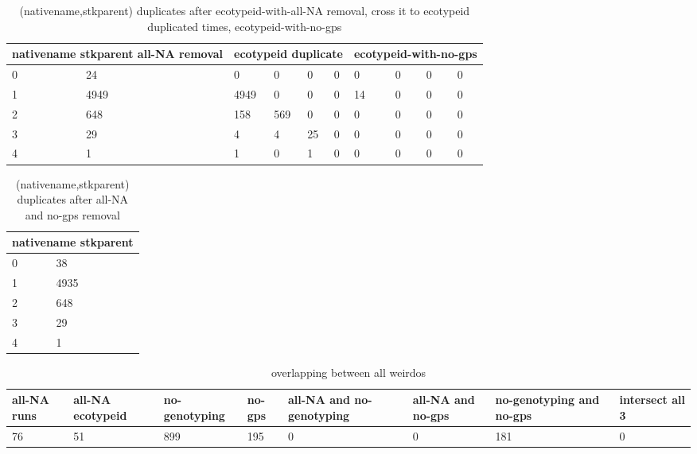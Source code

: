 \begin{center}
\begin{longtable}{|l|l|l|l|l|l|l|l|l|l|}
\caption{ (nativename,stkparent) duplicates after ecotypeid-with-all-NA removal, cross it to ecotypeid duplicated times, ecotypeid-with-no-gps} \label{t_nn_sp_e_4}\\
\hline
\multicolumn{2}{|c|}{nativename stkparent all-NA removal}&\multicolumn{4}{|c|}{ecotypeid duplicate}&\multicolumn{4}{|c|}{ecotypeid-with-no-gps}\\
\hline
0&24&0&0&0&0&0&0&0&0\\
1&4949&4949&0&0&0&14&0&0&0\\
2&648&158&569&0&0&0&0&0&0\\
3&29&4&4&25&0&0&0&0&0\\
4&1&1&0&1&0&0&0&0&0\\
\hline
\end{longtable}
\end{center}
\begin{center}
\begin{longtable}{|l|l|}
\caption{ (nativename,stkparent) duplicates after all-NA and no-gps removal} \label{t_nn_sp_e_5}\\
\hline
\multicolumn{2}{|c|}{nativename stkparent}\\
\hline
0&38\\
1&4935\\
2&648\\
3&29\\
4&1\\
\hline
\end{longtable}
\end{center}
\begin{center}
\begin{longtable}{|l|l|l|l|l|l|l|l|}
\caption{overlapping between all weirdos} \label{t_nn_sp_e_6}\\
\hline
all-NA runs&all-NA ecotypeid&no-genotyping&no-gps&all-NA and no-genotyping&all-NA and no-gps&no-genotyping and no-gps&intersect all 3\\
\hline
76&51&899&195&0&0&181&0\\
\hline
\end{longtable}
\end{center}
